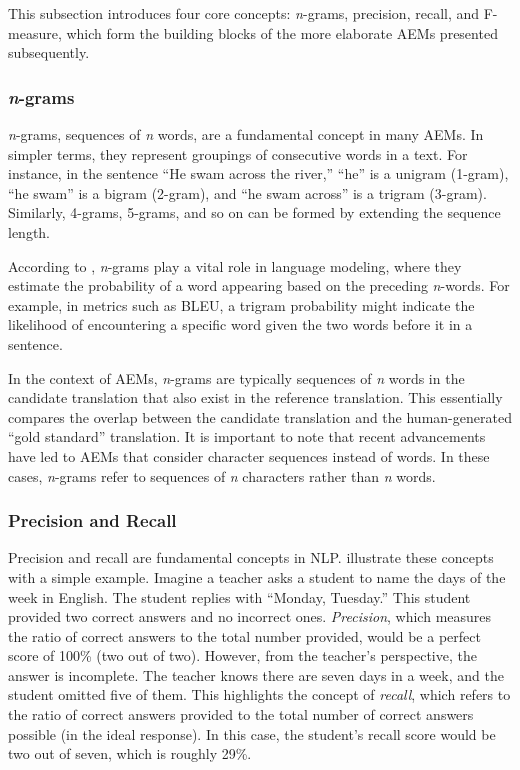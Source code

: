 {{This subsection introduces four core concepts: \emph{n}-grams, precision, recall, and F-measure, which form the building blocks of the more elaborate AEMs presented subsequently.

\subsubsection{\emph{n}-grams}

\emph{n}-grams, sequences of \emph{n} words, are a fundamental concept in many AEMs. In simpler terms, they represent groupings of consecutive words in a text. For instance, in the sentence ``He swam across the river,'' ``he'' is a unigram (1-gram), ``he swam'' is a bigram (2-gram), and ``he swam across'' is a trigram (3-gram). Similarly, 4-grams, 5-grams, and so on can be formed by extending the sequence length.

According to \textcite{Rossi2022}, \emph{n}-grams play a vital role in language modeling, where they estimate the probability of a word appearing based on the preceding \emph{n}-words. For example, in metrics such as BLEU, a trigram probability might indicate the likelihood of encountering a specific word given the two words before it in a sentence.

In the context of AEMs, \emph{n}-grams are typically sequences of \emph{n} words in the candidate translation that also exist in the reference translation. This essentially compares the overlap between the candidate translation and the human-generated ``gold standard'' translation. It is important to note that recent advancements have led to AEMs that consider character sequences instead of words. In these cases, \emph{n}-grams refer to sequences of \emph{n} characters rather than \emph{n} words.


\subsubsection{Precision and Recall}

Precision and recall are fundamental concepts in NLP. \textcite{Rossi2022} illustrate these concepts with a simple example. Imagine a teacher asks a student to name the days of the week in English. The student replies with ``Monday, Tuesday.'' This student provided two correct answers and no incorrect ones. \emph{Precision}, which measures the ratio of correct answers to the total number provided, would be a perfect score of 100\% (two out of two). However, from the teacher's perspective, the answer is incomplete. The teacher knows there are seven days in a week, and the student omitted five of them. This highlights the concept of \emph{recall}, which refers to the ratio of correct answers provided to the total number of correct answers possible (in the ideal response). In this case, the student's recall score would be two out of seven, which is roughly 29\%.

}}
